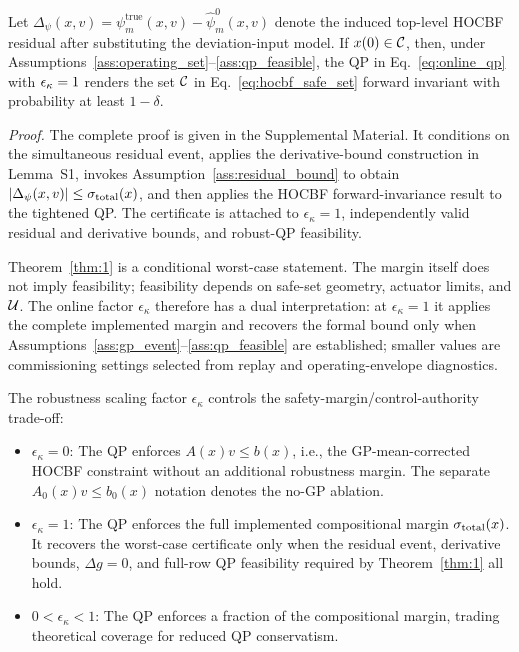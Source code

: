 \begin{theorem}
\label{thm:1}
Let $\Delta_{\psi}(x,v)=\psi_m^{\mathrm{true}}(x,v)-\hat{\psi}_m^0(x,v)$ denote the induced top-level HOCBF residual after substituting the deviation-input model. If $x(0)\in\mathcal{C}$, then, under Assumptions~\ref{ass:operating_set}--\ref{ass:qp_feasible}, the QP in Eq.~\eqref{eq:online_qp} with $\epsilon_\kappa=1$ renders the set $\mathcal{C}$ in Eq.~\eqref{eq:hocbf_safe_set} forward invariant with probability at least $1-\delta$.
\end{theorem}

\noindent\textit{Proof.}
The complete proof is given in the Supplemental Material. It conditions on the simultaneous residual event, applies the derivative-bound construction in Lemma~S1, invokes Assumption~\ref{ass:residual_bound} to obtain $|\Delta_\psi(x,v)|\leq\sigma_{\mathrm{total}}(x)$, and then applies the HOCBF forward-invariance result to the tightened QP. The certificate is attached to $\epsilon_\kappa=1$, independently valid residual and derivative bounds, and robust-QP feasibility.

Theorem~\ref{thm:1} is a conditional worst-case statement. The margin itself does not imply feasibility; feasibility depends on safe-set geometry, actuator limits, and $\mathcal{U}$. The online factor $\epsilon_\kappa$ therefore has a dual interpretation: at $\epsilon_\kappa=1$ it applies the complete implemented margin and recovers the formal bound only when Assumptions~\ref{ass:gp_event}--\ref{ass:qp_feasible} are established; smaller values are commissioning settings selected from replay and operating-envelope diagnostics.

The robustness scaling factor $\epsilon_\kappa$ controls the safety-margin/control-authority trade-off:

\begin{itemize}
    \item $\epsilon_\kappa = 0$: The QP enforces $A(x)v \leq b(x)$, i.e., the GP-mean-corrected HOCBF constraint without an additional robustness margin. The separate $A_0(x)v\leq b_0(x)$ notation denotes the no-GP ablation.
    \item $\epsilon_\kappa = 1$: The QP enforces the full implemented compositional margin $\sigma_{\mathrm{total}}(x)$. It recovers the worst-case certificate only when the residual event, derivative bounds, $\Delta g=0$, and full-row QP feasibility required by Theorem~\ref{thm:1} all hold.
    \item $0 < \epsilon_\kappa < 1$: The QP enforces a fraction of the compositional margin, trading theoretical coverage for reduced QP conservatism.
\end{itemize}

